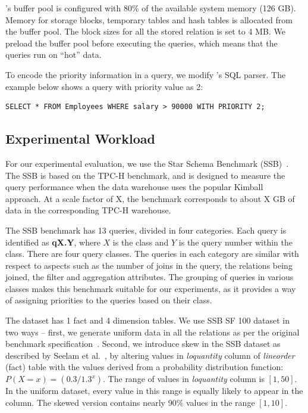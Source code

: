 \sys{}'s buffer pool is configured with 80\% of the available system memory (126 GB). 
Memory for storage blocks, temporary tables and hash tables is allocated from the buffer 
pool.
The block sizes for all the stored relation is set to 4 MB.
We preload the buffer pool before executing the queries, which means that the queries run 
on ``hot'' data. 

To encode the priority information in a query, we modify \sys{}'s SQL parser.
The example below shows a query with priority value as 2:
\begin{lstlisting}
SELECT * FROM Employees WHERE salary > 90000 WITH PRIORITY 2;
\end{lstlisting}
\vspace{-1em}

\subsection{Experimental Workload}\label{ssec:workload}
For our experimental evaluation, we use the Star Schema Benchmark (SSB)~\cite{ssb}. 
The SSB is based on the TPC-H benchmark, and is designed to measure the query performance when %
the data warehouse uses the popular Kimball~\cite{Kimball} approach. 
At a scale factor of X, the benchmark corresponds to about X GB of data in the 
corresponding TPC-H warehouse.

The SSB benchmark has 13 queries, divided in four categories. 
Each query is identified as \textbf{qX.Y}, where $X$ is the class and $Y$ is the query 
number within the class.
There are four query classes. 
The queries in each category are similar with respect to aspects such as the 
number of joins in the query, the relations being joined, the filter and aggregation 
attributes. 
The grouping of queries in various classes makes this benchmark suitable for our 
experiments, as it provides a way of assigning priorities to the queries based on their class. 

The dataset has 1 fact and 4 dimension tables. 
We use SSB SF 100 dataset in two ways -- first, we generate uniform data in all the relations as per the  original benchmark specification~\cite{ssb}.
Second, we introduce skew in the SSB dataset as described by Seelam et 
al.~\cite{DBLP:conf/wosp/2013}, by altering values in \textit{lo\textunderscore quantity} column of \textit{lineorder} (fact) table with the values derived from a probability distribution function: $ P(X=x) = (0.3/1.3^{x})$. 
The range of values in \textit{lo\textunderscore quantity} column is $[1, 50]$. 
In the uniform dataset, every value in this range is equally likely to appear in the column.
The skewed version contains nearly 90\% values in the range $[1, 10]$. 

